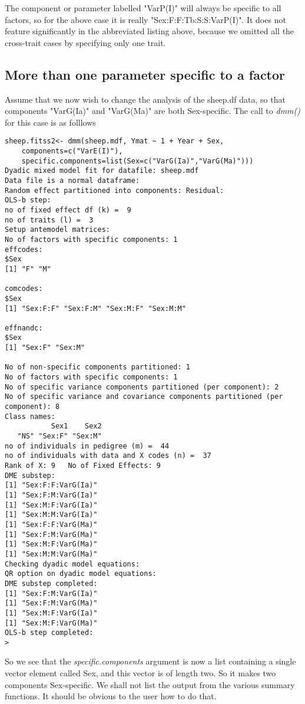 \documentclass[titlepage]{article}  %
\begin{document}
The component or parameter labelled "VarP(I)" will always be specific to  all factors, so for the above case it is really "Sex:F:F:Tb:S:S:VarP(I)". It does not feature significantly in the abbreviated listing above, because we omitted all the cross-trait cases by specifying only one trait.

\subsection{More than one parameter specific to a factor}
Assume that we now wish to change the analysis of the sheep.df data, so that components "VarG(Ia)" and "VarG(Ma)" are both Sex-specific.  The call to {\em dmm()} for this case is as folllows
\begin{verbatim}
sheep.fitss2<- dmm(sheep.mdf, Ymat ~ 1 + Year + Sex,
    components=c("VarE(I)"),
    specific.components=list(Sex=c("VarG(Ia)","VarG(Ma)")))
Dyadic mixed model fit for datafile: sheep.mdf  
Data file is a normal dataframe:
Random effect partitioned into components: Residual:
OLS-b step:
no of fixed effect df (k) =  9 
no of traits (l) =  3 
Setup antemodel matrices:
No of factors with specific components: 1 
effcodes:
$Sex
[1] "F" "M"

comcodes:
$Sex
[1] "Sex:F:F" "Sex:F:M" "Sex:M:F" "Sex:M:M"

effnandc:
$Sex
[1] "Sex:F" "Sex:M"

No of non-specific components partitioned: 1 
No of factors with specific components: 1 
No of specific variance components partitioned (per component): 2 
No of specific variance and covariance components partitioned (per component): 8 
Class names:
           Sex1    Sex2 
   "NS" "Sex:F" "Sex:M" 
no of individuals in pedigree (m) =  44 
no of individuals with data and X codes (n) =  37 
Rank of X: 9   No of Fixed Effects: 9 
DME substep:
[1] "Sex:F:F:VarG(Ia)"
[1] "Sex:F:M:VarG(Ia)"
[1] "Sex:M:F:VarG(Ia)"
[1] "Sex:M:M:VarG(Ia)"
[1] "Sex:F:F:VarG(Ma)"
[1] "Sex:F:M:VarG(Ma)"
[1] "Sex:M:F:VarG(Ma)"
[1] "Sex:M:M:VarG(Ma)"
Checking dyadic model equations:
QR option on dyadic model equations:
DME substep completed:
[1] "Sex:F:M:VarG(Ia)"
[1] "Sex:F:M:VarG(Ma)"
[1] "Sex:M:F:VarG(Ia)"
[1] "Sex:M:F:VarG(Ma)"
OLS-b step completed:
> 
\end{verbatim}
So we see that the {\em specific.components} argument  is now a list containing a single vector element called Sex, and this vector is of length two. So it makes two components Sex-specific. We shall not list the output from the various summary functions. It should be obvious to the user how to do that.
\end{document}
